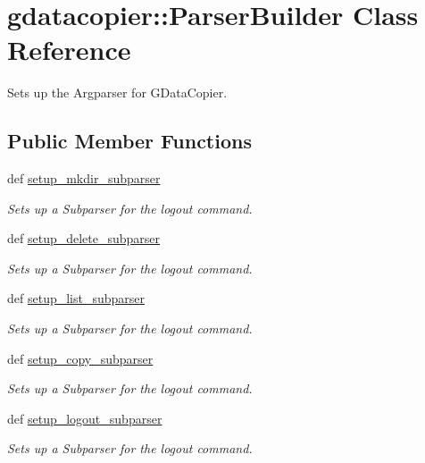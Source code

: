 \hypertarget{classgdatacopier_1_1_parser_builder}{\section{gdatacopier\-:\-:\-Parser\-Builder \-Class \-Reference}
\label{classgdatacopier_1_1_parser_builder}
}


\-Sets up the \-Argparser for \-G\-Data\-Copier.  


\subsection*{\-Public \-Member \-Functions}
\begin{DoxyCompactItemize}
\item 
def \hyperlink{classgdatacopier_1_1_parser_builder_ad312503e317e305c307c9a1fc7b6f2ba}{setup\-\_\-mkdir\-\_\-subparser}
\begin{DoxyCompactList}\small\item\em \-Sets up a \-Subparser for the logout command. \end{DoxyCompactList}\item 
def \hyperlink{classgdatacopier_1_1_parser_builder_a48f68b3b1b4be63c2d2d22cc686c07a8}{setup\-\_\-delete\-\_\-subparser}
\begin{DoxyCompactList}\small\item\em \-Sets up a \-Subparser for the logout command. \end{DoxyCompactList}\item 
def \hyperlink{classgdatacopier_1_1_parser_builder_afe0b42c588012dfafb526d12250556b7}{setup\-\_\-list\-\_\-subparser}
\begin{DoxyCompactList}\small\item\em \-Sets up a \-Subparser for the logout command. \end{DoxyCompactList}\item 
def \hyperlink{classgdatacopier_1_1_parser_builder_a47ddc5324ae7f8381e4c891dd16fc057}{setup\-\_\-copy\-\_\-subparser}
\begin{DoxyCompactList}\small\item\em \-Sets up a \-Subparser for the logout command. \end{DoxyCompactList}\item 
def \hyperlink{classgdatacopier_1_1_parser_builder_a87b6556b244d29352a9a0cc046557a04}{setup\-\_\-logout\-\_\-subparser}
\begin{DoxyCompactList}\small\item\em \-Sets up a \-Subparser for the logout command. \end{DoxyCompactList}\item 

\end{DoxyCompactItemize}

